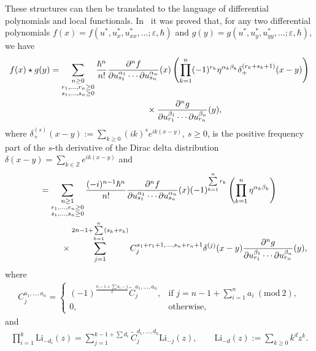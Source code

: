 \documentclass[pdftex]{sigma}
\numberwithin{equation}{section}
\newcommand{\mbZ}{\mathbb Z}
\newcommand{\<}{\left<}
\renewcommand{\>}{\right>}
\newcommand{\eps}{\varepsilon}
\newcommand{\tC}{\widetilde C}
\newcommand{\Li}{\mathrm{Li}}
\begin{document}
These structures can then be translated to the language of dif\/ferential polynomials and local functionals. In~\cite{BR15} it was proved that, for any two dif\/ferential polynomials $f(x)=f(u^*,u^*_x,u^*_{xx},\dots;\eps,\hbar)$ and $g(y)=g(u^*,u^*_y,u^*_{yy},\dots;\eps,\hbar)$, we have
\begin{gather*}
f(x)\star g(y) =\sum_{\substack{n\geq 0\\ r_1,\dots,r_n\geq 0\\ s_1,\dots , s_n\geq 0}} \frac{\hbar^{n}}{n!} \frac{\partial^n f}{\partial u^{\alpha_1}_{s_1}\cdots \partial u^{\alpha_n}_{s_n}}(x)\left( \prod_{k=1}^n (-1)^{r_k} \eta^{\alpha_k\beta_k} \delta_+^{(r_k + s_k +1)}(x-y) \right) \\
\hphantom{f(x)\star g(y) =}{}
\times \frac{\partial^n g}{\partial u^{\beta_1}_{r_1}\cdots \partial u^{\beta_n}_{r_n}}(y),
\end{gather*}
where $\delta_+^{(s)}(x-y):= \sum\limits_{k\geq 0} (ik)^s e^{i k (x-y)}$, $s\geq 0$, is the positive frequency part of the $s$-th derivative of the Dirac delta distribution $\delta(x-y)= \sum\limits_{k\in \mbZ} e^{i k (x-y)}$
and
\begin{gather}
[f(x),g(y)]=\sum_{\substack{n\geq 1\\ r_1,\dots ,r_n\geq 0\\ s_1,\dots,s_n\geq 0}} \frac{(-i)^{n-1} \hbar^{n}}{n!} \frac{\partial^n f}{\partial u^{\alpha_1}_{s_1}\cdots \partial u^{\alpha_n}_{s_n}}(x) (-1)^{\sum\limits_{k=1}^n r_k} \left( \prod_{k=1}^n \eta^{\alpha_k \beta_k}\right) \nonumber\\
\hphantom{[f(x),g(y)]=}{} \times \sum_{j=1}^{2n-1+\sum\limits_{k=1}^n (s_k+r_k)} C_j^{s_1+r_1+1,\dots,s_n+r_n+1}\delta^{(j)}(x-y)\frac{\partial^n g}{\partial u^{\beta_1}_{r_1}\cdots \partial u^{\beta_n}_{r_n}}(y),\label{eq:quantum commutator}
\end{gather}
where
\begin{gather*}%
C_j^{a_1,\dots,a_n}=
\begin{cases}
(-1)^{\frac{n-1+\sum a_i-j}{2}}\tC_j^{a_1,\dots,a_n},&\text{if $j=n-1+\sum\limits_{i=1}^n a_i\ (\mathrm{mod}\ 2)$},\\
0,&\text{otherwise},
\end{cases}
\end{gather*}
and
\begin{gather*}%
\prod_{i=1}^k\Li_{-d_i}(z)=\sum_{j=1}^{k-1+\sum d_i}\tC^{d_1,\dots,d_k}_j\Li_{-j}(z), \qquad \Li_{-d}(z):=\sum_{k\ge 0}k^d z^k.
\end{gather*}
\end{document}
